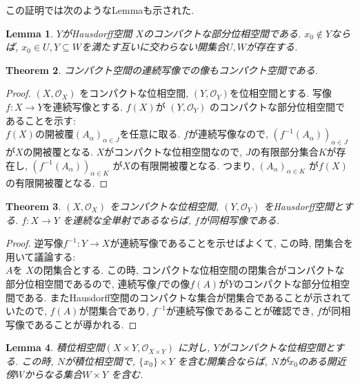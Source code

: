 \documentclass[lualatex]{ltjsbook}
\newtheorem{theorem}{Theorem}[chapter]
\newtheorem{lemma}[theorem]{Lemma}
\theoremstyle{remark}
\theoremstyle{plain}
\begin{document}
この証明では次のようなLemmaも示された.
\begin{lemma}
	\label{lem:compact-separate}
	$Y$がHausdorff空間 $X$のコンパクトな部分位相空間である.  $x_0 \not\in Y$ならば,  $x_0 \in U,  Y \subseteq W$を満たす互いに交わらない開集合$U, W$が存在する.
\end{lemma}

\begin{theorem}
	コンパクト空間の連続写像での像もコンパクト空間である.
\end{theorem}

\begin{proof}
	$\left( X ,  \mathcal{O}_{X} \right)$ をコンパクトな位相空間,  $\left( Y ,  \mathcal{O}_{Y} \right)$を位相空間とする. 
	写像$f: X \to Y$を連続写像とする. $f(X)$が $\left( Y ,  \mathcal{O}_{Y} \right)$ のコンパクトな部分位相空間であることを示す:\\
	$f(X)$の開被覆$\left( A_{\alpha} \right)_{\alpha \in J}$を任意に取る.
	$f$が連続写像なので,  $\left( f^{-1}(A_{\alpha}) \right) _{\alpha \in J}$ が$X$の開被覆となる.
	$X$がコンパクトな位相空間なので,   $J$の有限部分集合$K$が存在し,   $\left( f^{-1}(A_{\alpha}) \right)_{\alpha \in K} $ が$X$の有限開被覆となる. つまり,  $\left( A_{\alpha} \right) _{\alpha \in K}$ が$f(X)$の有限開被覆となる.

\end{proof}

\begin{theorem}
	$\left( X ,  \mathcal{O}_{X} \right)$ をコンパクトな位相空間,  $\left( Y ,  \mathcal{O}_{Y} \right)$ をHausdorff空間とする. $f: X \to Y$ を連続な全単射であるならば,  $f$が同相写像である.
\end{theorem}

\begin{proof}
	逆写像$f^{-1} :Y \to X$が連続写像であることを示せばよくて,  この時,  閉集合を用いて議論する:\\
	$A$を $X$の閉集合とする. この時,  コンパクトな位相空間の閉集合がコンパクトな部分位相空間であるので,   連続写像$f$での像$f(A)$が$Y$のコンパクトな部分位相空間である. 
	またHausdorff空間のコンパクトな集合が閉集合であることが示されていたので,  $f(A)$が閉集合であり,   $f^{-1}$が連続写像であることが確認でき,  $f$が同相写像であることが導かれる.
\end{proof}

\begin{lemma}
	積位相空間$\left( X\times Y ,  \mathcal{O}_{X\times Y} \right)$ に対し,  $Y$がコンパクトな位相空間とする. 
	この時,   $N$が積位相空間で,   $\{x_0\} \times Y$ を含む開集合ならば, 
	$N$が$x_0$のある開近傍$W$からなる集合$W\times Y$ を含む.
\end{lemma}
\end{document}

